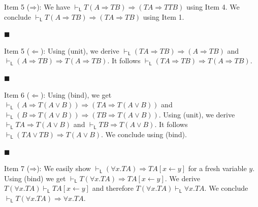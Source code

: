 Item 5 ($\mathbin{\Rightarrow}$): We have $\vdash_{\mathsf{L}}T(A\mathbin{\Rightarrow}TB)\mathbin{\Rightarrow}(TA\mathbin{\Rightarrow}TTB)$ using Item 4. We conclude $\vdash_{\mathsf{L}}T(A\mathbin{\Rightarrow}TB)\mathbin{\Rightarrow}(TA\mathbin{\Rightarrow}TB)$ using Item 1.\par
 
 
 
\par\noindent  $\blacksquare$ 
 
Item 5 ($\Leftarrow$): Using (unit), we derive $\vdash_{\mathsf{L}}(TA\mathbin{\Rightarrow}TB)\mathbin{\Rightarrow}(A\mathbin{\Rightarrow}TB)$ and $\vdash_{\mathsf{L}}(A\mathbin{\Rightarrow}TB)\mathbin{\Rightarrow}T(A\mathbin{\Rightarrow}TB)$. It follows $\vdash_{\mathsf{L}}(TA\mathbin{\Rightarrow}TB)\mathbin{\Rightarrow}T(A\mathbin{\Rightarrow}TB)$.\par
 
 
 
\par\noindent  $\blacksquare$ 
 
Item 6 ($\Leftarrow$): Using (bind), we get $\vdash_{\mathsf{L}}(A\mathbin{\Rightarrow}T(A\mathbin{\vee}B))\mathbin{\Rightarrow}(TA\mathbin{\Rightarrow}T(A\mathbin{\vee}B))$ and $\vdash_{\mathsf{L}}(B\mathbin{\Rightarrow}T(A\mathbin{\vee}B))\mathbin{\Rightarrow}(TB\mathbin{\Rightarrow}T(A\mathbin{\vee}B))$. Using (unit), we derive $\vdash_{\mathsf{L}}TA\mathbin{\Rightarrow}T(A\mathbin{\vee}B)$ and $\vdash_{\mathsf{L}}TB\mathbin{\Rightarrow}T(A\mathbin{\vee}B)$. It follows $\vdash_{\mathsf{L}}(TA\mathbin{\vee}TB)\mathbin{\Rightarrow}T(A\mathbin{\vee}B)$. We conclude using (bind).\par
 
 
 
\par\noindent  $\blacksquare$ 
 
Item 7 ($\mathbin{\Rightarrow}$): We easily show $\vdash_{\mathsf{L}}({\forall}x.TA)\mathbin{\Rightarrow}TA[x\leftarrow y]$ for a fresh variable $y$. Using (bind) we get $\vdash_{\mathsf{L}}T({\forall}x.TA)\mathbin{\Rightarrow}TA[x\leftarrow y]$. We derive $T({\forall}x.TA)\vdash_{\mathsf{L}}TA[x\leftarrow y]$ and therefore $T({\forall}x.TA)\vdash_{\mathsf{L}}{\forall}x.TA$. We conclude $\vdash_{\mathsf{L}}T({\forall}x.TA)\mathbin{\Rightarrow}{\forall}x.TA$.\par
 
